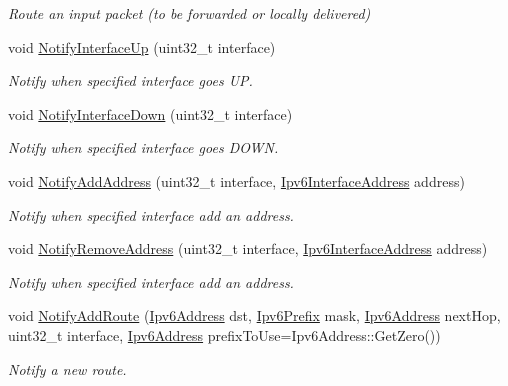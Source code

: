 \begin{DoxyCompactItemize}
\begin{DoxyCompactList}\small\item\em Route an input packet (to be forwarded or locally delivered) \end{DoxyCompactList}\item 
void \hyperlink{classIpv6BRouting_ab043d01b4e39e4777d43fe6f14120825}{Notify\+Interface\+Up} (uint32\+\_\+t interface)
\begin{DoxyCompactList}\small\item\em Notify when specified interface goes UP. \end{DoxyCompactList}\item 
void \hyperlink{classIpv6BRouting_a7923a1de31b147fae4ceeeea8bcacc6a}{Notify\+Interface\+Down} (uint32\+\_\+t interface)
\begin{DoxyCompactList}\small\item\em Notify when specified interface goes D\+O\+WN. \end{DoxyCompactList}\item 
void \hyperlink{classIpv6BRouting_aeec816a2f4f34b1461d3121d9cbbe2e6}{Notify\+Add\+Address} (uint32\+\_\+t interface, \hyperlink{classns3_1_1Ipv6InterfaceAddress}{Ipv6\+Interface\+Address} address)
\begin{DoxyCompactList}\small\item\em Notify when specified interface add an address. \end{DoxyCompactList}\item 
void \hyperlink{classIpv6BRouting_aca9d5c58f60cdcfd8cc5b5a3114be91f}{Notify\+Remove\+Address} (uint32\+\_\+t interface, \hyperlink{classns3_1_1Ipv6InterfaceAddress}{Ipv6\+Interface\+Address} address)
\begin{DoxyCompactList}\small\item\em Notify when specified interface add an address. \end{DoxyCompactList}\item 
void \hyperlink{classIpv6BRouting_ad1975c8950305b2aa2125fd7d229d13c}{Notify\+Add\+Route} (\hyperlink{classns3_1_1Ipv6Address}{Ipv6\+Address} dst, \hyperlink{classns3_1_1Ipv6Prefix}{Ipv6\+Prefix} mask, \hyperlink{classns3_1_1Ipv6Address}{Ipv6\+Address} next\+Hop, uint32\+\_\+t interface, \hyperlink{classns3_1_1Ipv6Address}{Ipv6\+Address} prefix\+To\+Use=Ipv6\+Address\+::\+Get\+Zero())
\begin{DoxyCompactList}\small\item\em Notify a new route. \end{DoxyCompactList}\item 

\end{DoxyCompactItemize}
